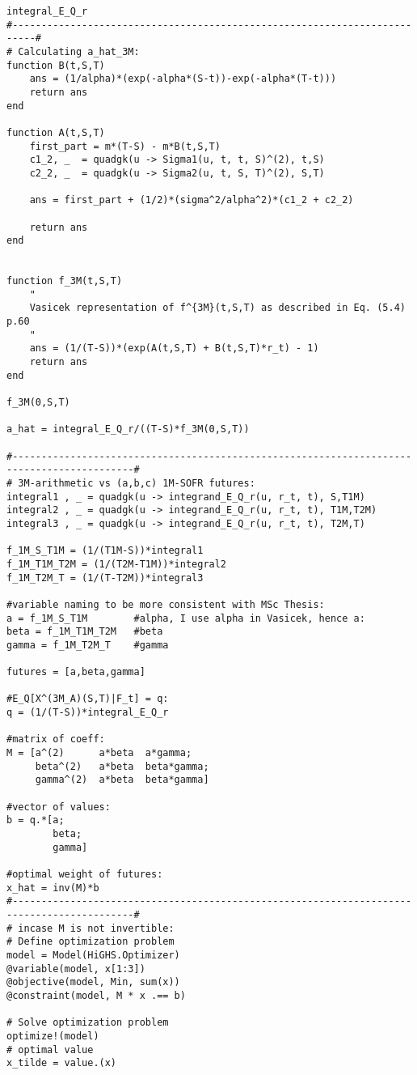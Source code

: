 \begin{verbatim}
integral_E_Q_r
#--------------------------------------------------------------------------#
# Calculating a_hat_3M:
function B(t,S,T)
    ans = (1/alpha)*(exp(-alpha*(S-t))-exp(-alpha*(T-t)))
    return ans
end

function A(t,S,T)
    first_part = m*(T-S) - m*B(t,S,T)
    c1_2, _  = quadgk(u -> Sigma1(u, t, t, S)^(2), t,S) 
    c2_2, _  = quadgk(u -> Sigma2(u, t, S, T)^(2), S,T)

    ans = first_part + (1/2)*(sigma^2/alpha^2)*(c1_2 + c2_2)

    return ans
end


function f_3M(t,S,T)
    " 
    Vasicek representation of f^{3M}(t,S,T) as described in Eq. (5.4) p.60
    "
    ans = (1/(T-S))*(exp(A(t,S,T) + B(t,S,T)*r_t) - 1)
    return ans
end

f_3M(0,S,T)

a_hat = integral_E_Q_r/((T-S)*f_3M(0,S,T))

#-------------------------------------------------------------------------------------------#
# 3M-arithmetic vs (a,b,c) 1M-SOFR futures: 
integral1 , _ = quadgk(u -> integrand_E_Q_r(u, r_t, t), S,T1M)
integral2 , _ = quadgk(u -> integrand_E_Q_r(u, r_t, t), T1M,T2M)
integral3 , _ = quadgk(u -> integrand_E_Q_r(u, r_t, t), T2M,T)

f_1M_S_T1M = (1/(T1M-S))*integral1
f_1M_T1M_T2M = (1/(T2M-T1M))*integral2
f_1M_T2M_T = (1/(T-T2M))*integral3

#variable naming to be more consistent with MSc Thesis:
a = f_1M_S_T1M        #alpha, I use alpha in Vasicek, hence a: 
beta = f_1M_T1M_T2M   #beta
gamma = f_1M_T2M_T    #gamma

futures = [a,beta,gamma]

#E_Q[X^(3M_A)(S,T)|F_t] = q: 
q = (1/(T-S))*integral_E_Q_r 

#matrix of coeff: 
M = [a^(2)      a*beta  a*gamma;
     beta^(2)   a*beta  beta*gamma; 
     gamma^(2)  a*beta  beta*gamma] 
     
#vector of values: 
b = q.*[a;
        beta;
        gamma] 

#optimal weight of futures:
x_hat = inv(M)*b 
#-------------------------------------------------------------------------------------------#
# incase M is not invertible: 
# Define optimization problem
model = Model(HiGHS.Optimizer)
@variable(model, x[1:3])
@objective(model, Min, sum(x))
@constraint(model, M * x .== b)

# Solve optimization problem
optimize!(model)
# optimal value
x_tilde = value.(x)


\end{verbatim}
